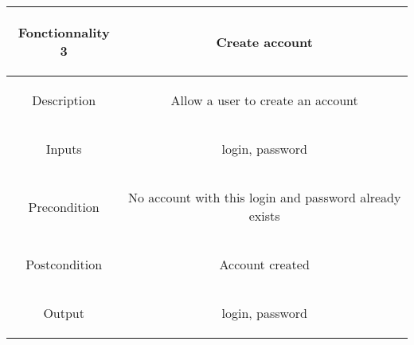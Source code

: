 \documentclass{report}
\begin{document}
\begin{center}
	\begin{tabular}{|c|c|}
	\hline
	\begin{bf}Fonctionnality 3\end{bf} & \begin{bf}Create account\end{bf} \\
	\hline
	\begin{bf}Description\end{bf} & \begin{bf}Allow a user to create an account\end{bf}  \\
	\hline
	\begin{bf}Inputs\end{bf} & \begin{bf}login, password\end{bf} \\
	\hline
	\begin{bf}Precondition\end{bf} & \begin{bf}No account with this login and password already exists\end{bf}  \\
	\hline
	\begin{bf}Postcondition\end{bf} & \begin{bf}Account created\end{bf} \\
	\hline
	\begin{bf}Output\end{bf} & \begin{bf}login, password\end{bf} \\
	\hline
	\end{tabular}
\end{center}
\end{document}
